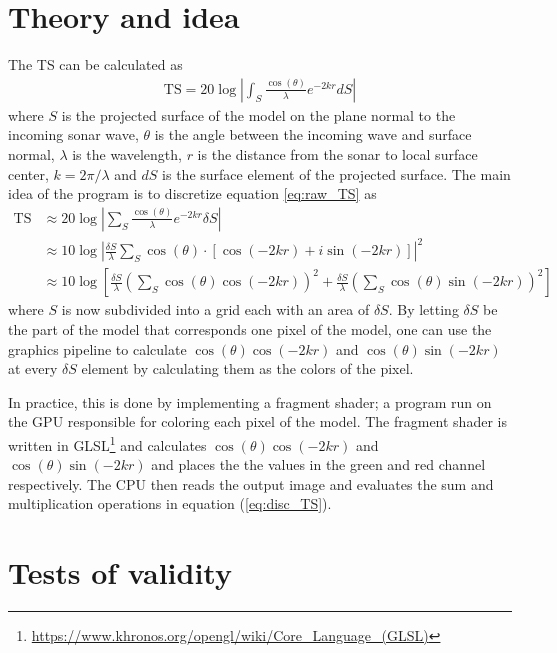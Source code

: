 \documentclass[a4paper, 11pt]{article}
\newcommand{\TS}{\mathrm{TS}}
\begin{document}
\section{Theory and idea}

    The TS can be calculated as 
    \begin{align}
        \label{eq:raw_TS}
        \TS = 20 \log \left|\int_S \frac{\cos(\theta)}{\lambda} e^{-2kr} dS \right|
    \end{align}
    where $S$ is the projected surface of the model on the plane normal to the incoming sonar wave, $\theta$ is the angle between the incoming wave and surface normal, $\lambda$ is the wavelength, $r$ is the distance from the sonar to local surface center, $k = 2\pi/\lambda$ and $dS$ is the surface element of the projected surface. The main idea of the program is to discretize equation \ref{eq:raw_TS} as  
    \begin{align}
        \label{eq:disc_TS}
        \TS & \approx 20 \log \left| \sum_S \frac{\cos(\theta)}{\lambda}e^{-2kr} \delta S \right| \\ 
            & \approx 10 \log \left| \frac{\delta S}{\lambda} \sum_S \cos(\theta) \cdot [\cos(-2kr) + i\sin(-2kr)] \right|^2  \\
            & \approx 10 \log \left[ \frac{\delta S}{\lambda} \left( \sum_S \cos(\theta)\cos(-2kr)  \right)^2 + \frac{\delta S}{\lambda}\left( \sum_S \cos(\theta)\sin(-2kr)  \right)^2  \right] 
    \end{align}
    where $S$ is now subdivided into a grid each with an area of $\delta S$. By letting $\delta S$ be the part of the model that corresponds one pixel of the model, one can use the graphics pipeline to calculate $\cos(\theta) \cos(-2kr)$ and $\cos(\theta) \sin(-2kr)$ at every $\delta S$ element by calculating them as the colors of the pixel.
    
    In practice, this is done by implementing a fragment shader; a program run on the GPU responsible for coloring each pixel of the model. The fragment shader is written in GLSL\footnote{\url{https://www.khronos.org/opengl/wiki/Core_Language_(GLSL)}} and calculates $\cos(\theta) \cos(-2kr)$ and $\cos(\theta) \sin(-2kr)$ and places the the values in the green and red channel respectively. The CPU then reads the output image and evaluates the sum and multiplication operations in equation (\ref{eq:disc_TS}).  

\section{Tests of validity}
\end{document}
